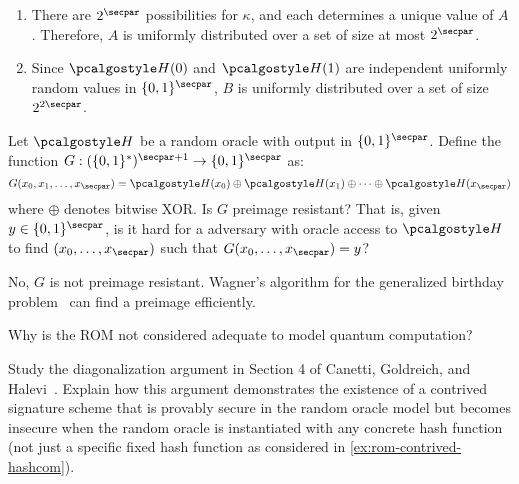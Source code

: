 \ifsolutions
\begin{mysolution}
  \begin{enumerate}
    \item There are $2^\secpar$ possibilities for $\kappa$, and each determines a unique value of $A$. Therefore, $A$ is uniformly distributed over a set of size at most $2^\secpar$.
    \item Since $\algo{H}(0)$ and $\algo{H}(1)$ are independent uniformly random values in $\{0,1\}^\secpar$, $B$ is uniformly distributed over a set of size $2^{2\secpar}$.
  \end{enumerate}
\end{mysolution}
\fi

\begin{exercise}[Optional]
  Let $\algo{H}$ be a random oracle with output in $\{0,1\}^\secpar$. Define the function $G: (\{0,1\}^*)^{\secpar+1} \rightarrow \{0,1\}^\secpar$ as:
  \[
  G(x_0, x_1, \ldots, x_\secpar) = \algo{H}(x_0) \oplus \algo{H}(x_1) \oplus \cdots \oplus \algo{H}(x_\secpar)
  \]
  where $\oplus$ denotes bitwise XOR. Is $G$ preimage resistant? That is, given $y \in \{0,1\}^\secpar$, is it hard for a \ppt adversary with oracle access to $\algo{H}$ to find $(x_0, \ldots, x_\secpar)$ such that $G(x_0, \ldots, x_\secpar) = y$?
\end{exercise}

\ifsolutions
\begin{mysolution}
  No, $G$ is not preimage resistant. Wagner's algorithm for the generalized birthday problem~\cite{C:Wagner02} can find a preimage efficiently.
\end{mysolution}
\fi

\begin{exercise}[Optional]
  Why is the ROM not considered adequate to model quantum computation?
\end{exercise}

\begin{exercise}[Optional]
  Study the diagonalization argument in Section 4 of Canetti, Goldreich, and Halevi~\cite{STOC:CanGolHal98}.
  Explain how this argument demonstrates the existence of a contrived signature scheme that is provably secure in the random oracle model but becomes insecure when the random oracle is instantiated with any concrete hash function (not just a specific fixed hash function as considered in \autoref{ex:rom-contrived-hashcom}).
\end{exercise}
